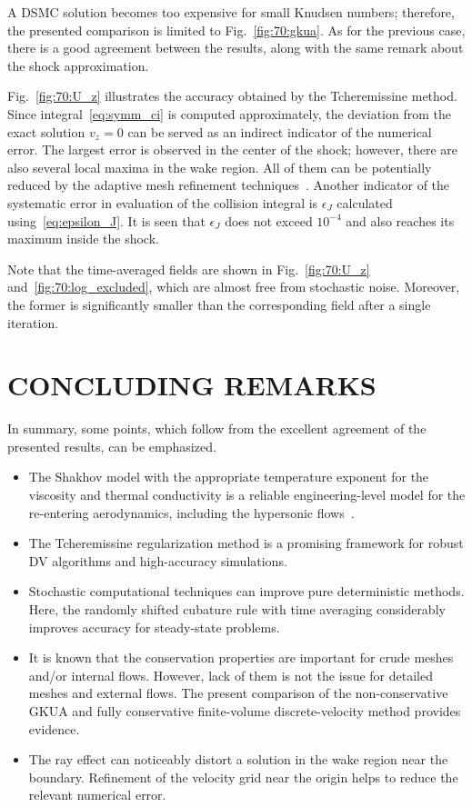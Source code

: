\documentclass{aip-cp}
\begin{document}
A DSMC solution becomes too expensive for small Knudsen numbers;
therefore, the presented comparison is limited to Fig.~\ref{fig:70:gkua}.
As for the previous case, there is a good agreement between the results,
along with the same remark about the shock approximation.

Fig.~\ref{fig:70:U_z} illustrates the accuracy obtained by the Tcheremissine method.
Since integral~\eqref{eq:symm_ci} is computed approximately,
the deviation from the exact solution \(v_z=0\) can be served as an indirect indicator of the numerical error.
The largest error is observed in the center of the shock;
however, there are also several local maxima in the wake region.
All of them can be potentially reduced by the adaptive mesh refinement techniques~\cite{Kolobov2013}.
Another indicator of the systematic error in evaluation of the collision integral is \(\epsilon_J\)
calculated using~\eqref{eq:epsilon_J}. It is seen that \(\epsilon_J\) does not exceed \(10^{-4}\)
and also reaches its maximum inside the shock.

Note that the time-averaged fields are shown in Fig.~\ref{fig:70:U_z} and~\ref{fig:70:log_excluded},
which are almost free from stochastic noise.
Moreover, the former is significantly smaller than the corresponding field after a single iteration.

\section{CONCLUDING REMARKS}

In summary, some points, which follow from the excellent agreement of the presented results, can be emphasized.
\begin{itemize}
    \item The Shakhov model with the appropriate temperature exponent for the viscosity and thermal conductivity
    is a reliable engineering-level model for the re-entering aerodynamics,
    including the hypersonic flows~\cite{Titarev2018, Frolova2018}.
    \item The Tcheremissine regularization method is a promising framework for robust DV algorithms and high-accuracy simulations.
    \item Stochastic computational techniques can improve pure deterministic methods.
    Here, the randomly shifted cubature rule with time averaging considerably improves accuracy for steady-state problems.
    \item It is known that the conservation properties are important for crude meshes and/or internal flows.
    However, lack of them is not the issue for detailed meshes and external flows. The present comparison of
    the non-conservative GKUA and fully conservative finite-volume discrete-velocity method provides evidence.
    \item The ray effect can noticeably distort a solution in the wake region near the boundary.
    Refinement of the velocity grid near the origin helps to reduce the relevant numerical error.
\end{itemize}
\end{document}
